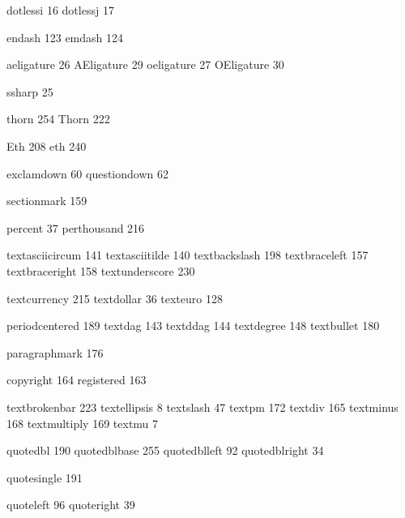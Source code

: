  dotlessi          16
 dotlessj          17

 endash           123
 emdash           124

 aeligature        26
 AEligature        29
 oeligature        27
 OEligature        30

 ssharp            25

 thorn            254
 Thorn            222

 Eth              208
 eth              240

 exclamdown        60
 questiondown      62

 sectionmark      159

 percent           37
 perthousand      216

 textasciicircum  141
 textasciitilde   140
 textbackslash    198
 textbraceleft    157
 textbraceright   158
 textunderscore   230

 textcurrency     215
 textdollar        36
 texteuro         128

 periodcentered   189
 textdag          143
 textddag         144
 textdegree       148
 textbullet       180

 paragraphmark    176

 copyright        164
 registered       163

 textbrokenbar    223
 textellipsis       8
 textslash         47
 textpm           172
 textdiv          165
 textminus        168
 textmultiply     169
 textmu             7

 quotedbl         190
 quotedblbase     255
 quotedblleft      92
 quotedblright     34

 quotesingle      191

 quoteleft         96
 quoteright        39

